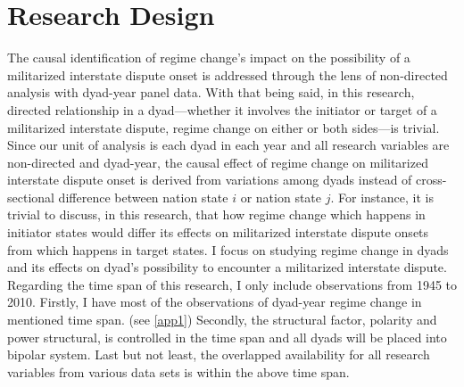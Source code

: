 \documentclass[12pt,a4paper]{article}
\begin{document}
\section{Research Design}
The causal identification of regime change's impact on the possibility of a militarized interstate dispute onset is addressed through the lens of non-directed analysis with dyad-year panel data. With that being said, in this research, directed relationship in a dyad---whether it involves the initiator or target of a militarized interstate dispute, regime change on either or both sides---is trivial. Since our unit of analysis is each dyad in each year and all research variables are non-directed and dyad-year, the causal effect of regime change on militarized interstate dispute onset is derived from variations among dyads instead of cross-sectional difference between nation state $i$ or nation state $j$. For instance, it is trivial to discuss, in this research, that how regime change which happens in initiator states would differ its effects on militarized interstate dispute onsets from which happens in target states. I focus on studying regime change in dyads and its effects on dyad's possibility to encounter a militarized interstate dispute.
\\Regarding the time span of this research, I only include observations from 1945 to 2010. Firstly, I have most of the observations of dyad-year regime change in mentioned time span. (see \ref{app1}) Secondly, the structural factor, polarity and power structural, is controlled in the time span and all dyads will be placed into bipolar system. Last but not least, the overlapped availability for all research variables from various data sets is within the above time span.
\end{document}
